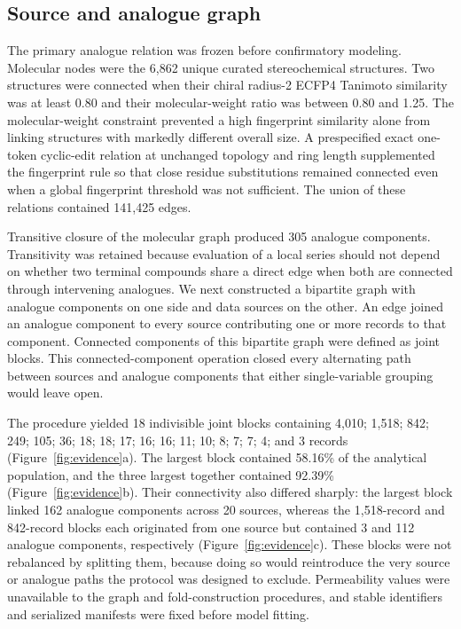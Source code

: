 \documentclass[referee,lineno,pdflatex,sn-vancouver-num]{sn-jnl}
\begin{document}
\FloatBarrier
\subsection{Source and analogue graph}

The primary analogue relation was frozen before confirmatory modeling. Molecular nodes were the 6,862 unique curated stereochemical structures. Two structures were connected when their chiral radius-2 ECFP4 Tanimoto similarity was at least 0.80 and their molecular-weight ratio was between 0.80 and 1.25. The molecular-weight constraint prevented a high fingerprint similarity alone from linking structures with markedly different overall size. A prespecified exact one-token cyclic-edit relation at unchanged topology and ring length supplemented the fingerprint rule so that close residue substitutions remained connected even when a global fingerprint threshold was not sufficient. The union of these relations contained 141,425 edges.

Transitive closure of the molecular graph produced 305 analogue components. Transitivity was retained because evaluation of a local series should not depend on whether two terminal compounds share a direct edge when both are connected through intervening analogues. We next constructed a bipartite graph with analogue components on one side and data sources on the other. An edge joined an analogue component to every source contributing one or more records to that component. Connected components of this bipartite graph were defined as joint blocks. This connected-component operation closed every alternating path between sources and analogue components that either single-variable grouping would leave open.

The procedure yielded 18 indivisible joint blocks containing 4,010; 1,518; 842; 249; 105; 36; 18; 18; 17; 16; 16; 11; 10; 8; 7; 7; 4; and 3 records (Figure~\ref{fig:evidence}a). The largest block contained 58.16\% of the analytical population, and the three largest together contained 92.39\% (Figure~\ref{fig:evidence}b). Their connectivity also differed sharply: the largest block linked 162 analogue components across 20 sources, whereas the 1,518-record and 842-record blocks each originated from one source but contained 3 and 112 analogue components, respectively (Figure~\ref{fig:evidence}c). These blocks were not rebalanced by splitting them, because doing so would reintroduce the very source or analogue paths the protocol was designed to exclude. Permeability values were unavailable to the graph and fold-construction procedures, and stable identifiers and serialized manifests were fixed before model fitting.
\end{document}

